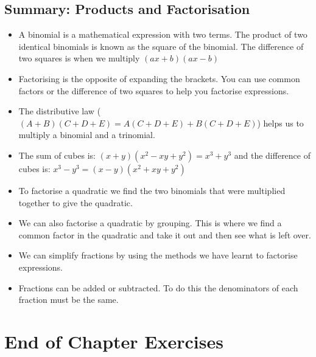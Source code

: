 \subsection{Summary: Products and Factorisation}
\label{m39392*eip-735}
            \nopagebreak
            \label{m39392*uid0812}\begin{itemize}[noitemsep]
            \item A binomial is a mathematical expression with two terms. The product of two identical binomials is known as the square of the binomial. The difference of two squares is when we multiply
                $\left(ax+b\right)\left(ax-b\right)$\item Factorising is the opposite of expanding the brackets. You can use common factors or the difference of two squares to help you factorise expressions.\item The distributive law ($\left(A+B\right)\left(C+D+E\right)=A\left(C+D+E\right)+B\left(C+D+E\right)$) helps us to multiply a binomial and a trinomial.\item The sum of cubes is: $\left(x+y\right)\left({x}^{2}-xy+{y}^{2}\right)={x}^{3}+{y}^{3}$ and the difference of cubes is: ${x}^{3}-{y}^{3}=\left(x-y\right)\left({x}^{2}+xy+{y}^{2}\right)$\item To factorise a quadratic we find the two binomials that were multiplied together to give the quadratic.\item We can also factorise a quadratic by grouping. This is where we find a common factor in the quadratic and take it out and then see what is left over.\item We can simplify fractions by using the methods we have learnt to factorise expressions.\item Fractions can be added or subtracted. To do this the denominators of each fraction must be the same.\end{itemize}
        \label{m39392*cid8}
\section{End of Chapter Exercises}
